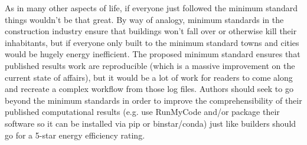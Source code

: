 As in many other aspects of life, if everyone just followed the minimum standard things wouldn't be that great. By way of analogy, minimum standards in the construction industry ensure that buildings won't fall over or otherwise kill their inhabitants, but if everyone only built to the minimum standard towns and cities would be hugely energy inefficient. The proposed minimum standard ensures that published results work are reproducible (which is a massive improvement on the current state of affairs), but it would be a lot of work for readers to come along and recreate a complex workflow from those log files. Authors should seek to go beyond the minimum standards in order to improve the comprehensibility of their published computational results (e.g. use RunMyCode and/or package their software so it can be installed via pip or binstar/conda) just like builders should go for a 5-star energy efficiency rating.
